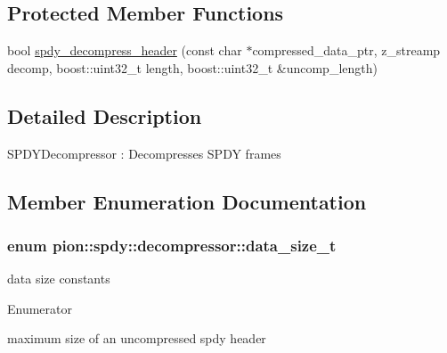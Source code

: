 \subsection*{Protected Member Functions}
\begin{DoxyCompactItemize}
\item 
bool \hyperlink{classpion_1_1spdy_1_1decompressor_ab6c148eb985c1e016235cef3863913c8}{spdy\-\_\-decompress\-\_\-header} (const char $\ast$compressed\-\_\-data\-\_\-ptr, z\-\_\-streamp decomp, boost\-::uint32\-\_\-t length, boost\-::uint32\-\_\-t \&uncomp\-\_\-length)
\end{DoxyCompactItemize}


\subsection{Detailed Description}
S\-P\-D\-Y\-Decompressor \-: Decompresses S\-P\-D\-Y frames 

\subsection{Member Enumeration Documentation}
\hypertarget{classpion_1_1spdy_1_1decompressor_a9fb34f033b4d95e5f23fa9b0d03c4818}{
\subsubsection[{data\-\_\-size\-\_\-t}]{\setlength{\rightskip}{0pt plus 5cm}enum {\bf pion\-::spdy\-::decompressor\-::data\-\_\-size\-\_\-t}}}\label{classpion_1_1spdy_1_1decompressor_a9fb34f033b4d95e5f23fa9b0d03c4818}


data size constants 

\begin{Desc}
\item[Enumerator]\par
\begin{description}
\item[{\em 
\hypertarget{classpion_1_1spdy_1_1decompressor_a9fb34f033b4d95e5f23fa9b0d03c4818a44ab53316cb7bd9c9d66621b6e537e08}{M\-A\-X\-\_\-\-U\-N\-C\-O\-M\-P\-R\-E\-S\-S\-E\-D\-\_\-\-D\-A\-T\-A\-\_\-\-B\-U\-F\-\_\-\-S\-I\-Z\-E}\label{classpion_1_1spdy_1_1decompressor_a9fb34f033b4d95e5f23fa9b0d03c4818a44ab53316cb7bd9c9d66621b6e537e08}
}]maximum size of an uncompressed spdy header \end{description}
\end{Desc}


